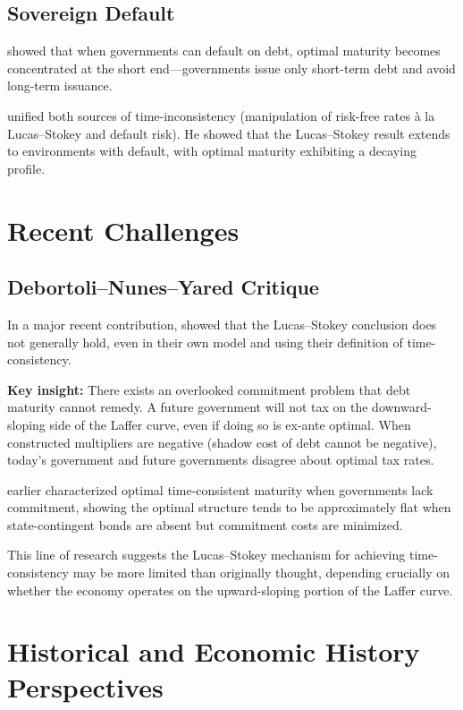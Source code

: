 \documentclass[12pt]{article}
\begin{document}
\subsection{Sovereign Default}

\citet{aguiar_amador_hopenhayn_werning_2019} showed that when governments can default on debt, optimal maturity becomes concentrated at the short end---governments issue only short-term debt and avoid long-term issuance.

\citet{kiiashko_2022} unified both sources of time-inconsistency (manipulation of risk-free rates \`a la Lucas--Stokey and default risk). He showed that the Lucas--Stokey result extends to environments with default, with optimal maturity exhibiting a decaying profile.

\section{Recent Challenges}

\subsection{Debortoli--Nunes--Yared Critique}

In a major recent contribution, \citet{debortoli_nunes_yared_2021} showed that the Lucas--Stokey conclusion does not generally hold, even in their own model and using their definition of time-consistency. 

\textbf{Key insight:} There exists an overlooked commitment problem that debt maturity cannot remedy. A future government will not tax on the downward-sloping side of the Laffer curve, even if doing so is ex-ante optimal. When constructed multipliers are negative (shadow cost of debt cannot be negative), today's government and future governments disagree about optimal tax rates.

\citet{debortoli_nunes_yared_2017} earlier characterized optimal time-consistent maturity when governments lack commitment, showing the optimal structure tends to be approximately flat when state-contingent bonds are absent but commitment costs are minimized.

This line of research suggests the Lucas--Stokey mechanism for achieving time-consistency may be more limited than originally thought, depending crucially on whether the economy operates on the upward-sloping portion of the Laffer curve.

\section{Historical and Economic History Perspectives}
\end{document}

